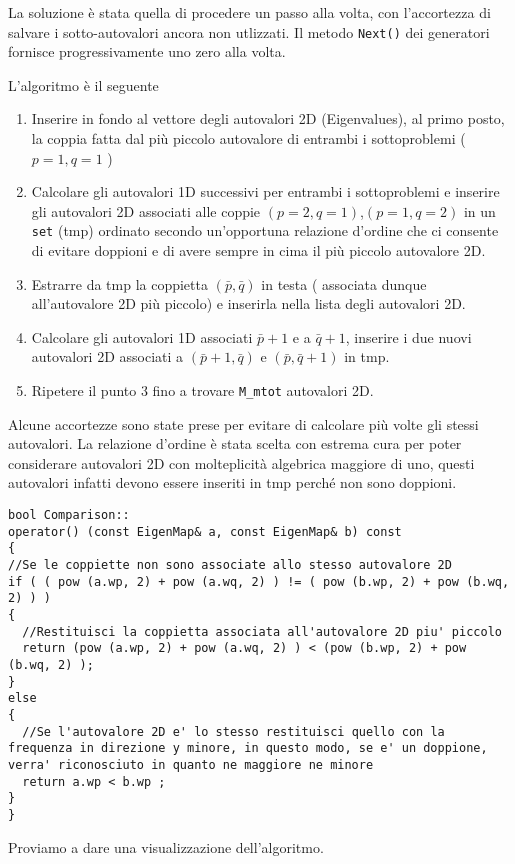 La soluzione \`e stata quella di procedere un passo alla volta, con l'accortezza di salvare i sotto-autovalori ancora non utlizzati. 
Il metodo \texttt{Next()} dei generatori fornisce progressivamente uno 
zero alla volta.

L'algoritmo \`e il seguente
\begin{enumerate}
 \item Inserire in fondo al vettore degli autovalori 2D (Eigenvalues), al primo posto, la coppia fatta dal pi\`u piccolo autovalore di entrambi i sottoproblemi ( $p=1,q=1$ )
 \item Calcolare gli autovalori 1D successivi  per entrambi i sottoproblemi e inserire gli autovalori 2D associati alle coppie $(p=2,q=1)$,$(p=1,q=2)$
 in un \texttt{set} (tmp) ordinato secondo un'opportuna relazione d'ordine che ci consente di evitare doppioni e di avere sempre in cima il pi\`u 
 piccolo autovalore 2D.
 \item Estrarre da tmp la coppietta $(\bar p,\bar q)$ in testa ( associata dunque all'autovalore 2D pi\`u piccolo) e inserirla nella lista degli autovalori 2D.
 \item Calcolare gli autovalori 1D associati $\bar p +1$ e a $\bar q+1$, inserire i due nuovi autovalori 2D associati a $(\bar p+1,\bar q)$ e $(\bar p,\bar q+1)$ in tmp.
 \item Ripetere il punto 3 fino a trovare \texttt{M\_mtot} autovalori 2D.
\end{enumerate}

Alcune accortezze sono state prese per evitare di calcolare pi\`u volte gli stessi autovalori. La relazione d'ordine \`e stata scelta con estrema
cura per poter considerare autovalori 2D con molteplicit\`a algebrica maggiore di uno, questi autovalori infatti devono essere inseriti in tmp perch\'e
non sono doppioni.
\begin{lstlisting}[style = general]
bool Comparison::
operator() (const EigenMap& a, const EigenMap& b) const
{
//Se le coppiette non sono associate allo stesso autovalore 2D
if ( ( pow (a.wp, 2) + pow (a.wq, 2) ) != ( pow (b.wp, 2) + pow (b.wq, 2) ) ) 
{
  //Restituisci la coppietta associata all'autovalore 2D piu' piccolo
  return (pow (a.wp, 2) + pow (a.wq, 2) ) < (pow (b.wp, 2) + pow (b.wq, 2) ); 
}
else
{
  //Se l'autovalore 2D e' lo stesso restituisci quello con la frequenza in direzione y minore, in questo modo, se e' un doppione, verra' riconosciuto in quanto ne maggiore ne minore
  return a.wp < b.wp ; 
}
}
\end{lstlisting}
Proviamo a dare una visualizzazione dell'algoritmo.

